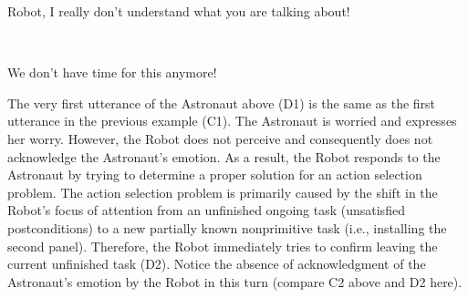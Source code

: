 \begin{description}
  \item \textit{\textbf{\fontsize{9pt}{12pt}\selectfont{D9. Astronaut:}}} Robot,
  I really don't understand what you are talking about!\\
  
  \item {}\\

  \item \textit{\textbf{\fontsize{9pt}{12pt}\selectfont{D11. Astronaut:}}} We
  don't have time for this anymore!
  
\end{description}

The very first utterance of the Astronaut above (D1) is the same as the first
utterance in the previous example (C1). The Astronaut is worried and expresses
her worry. However, the Robot does not perceive and consequently does not
acknowledge the Astronaut's emotion. As a result, the Robot responds to the
Astronaut by trying to determine a proper solution for an action selection
problem. The action selection problem is primarily caused by the shift in the
Robot's focus of attention from an unfinished ongoing task (unsatisfied
postconditions) to a new partially known nonprimitive task (i.e., installing the
second panel). Therefore, the Robot immediately tries to confirm leaving the
current unfinished task (D2). Notice the absence of acknowledgment of the
Astronaut's emotion by the Robot in this turn (compare C2 above and D2 here).

